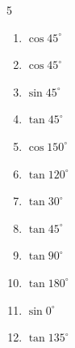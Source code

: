 \begin{multicols}{5}
\begin{enumerate}

  \item $\displaystyle \cos{45^\circ}$


  \item $\displaystyle \cos{45^\circ}$


  \item $\displaystyle \sin{45^\circ}$


  \item $\displaystyle \tan{45^\circ}$

        \phantom{$\displaystyle =1$}

  \item $\displaystyle \cos{150^\circ}$


  \item $\displaystyle \tan{120^\circ}$


  \item $\displaystyle \tan{30^\circ}$


  \item $\displaystyle \tan{45^\circ}$

        \phantom{$\displaystyle =1$}

\columnbreak %

  \item $\displaystyle \tan{90^\circ}$

        \phantom{$\displaystyle なし$}

  \item $\displaystyle \tan{180^\circ}$

        \phantom{$\displaystyle =0$}

  \item $\displaystyle \sin{0^\circ}$

        \phantom{$\displaystyle =0$}

  \item $\displaystyle \tan{135^\circ}$

        \phantom{$\displaystyle =-1$}


\end{enumerate}
\end{multicols}
